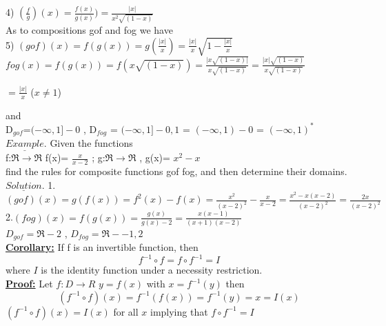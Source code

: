 \documentclass[11pt]{amsbook}
\begin{document}
4) $ (\frac{f}{g})(x) = \frac{f(x)}{g(x)}) = \frac{|x|}{x^2\sqrt{(1-x)} } $\\
As to compositions gof and fog we have\\
\vspace{4 mm}
5) $ (gof)(x) = f(g(x)) = g(\frac{|x|}{x}) =\frac{|x|}{x} \sqrt{1-\frac{|x|}{x}}$\\
$fog(x) = f(g(x))= f(x\sqrt {(1-x)}) = \frac {|x\sqrt{ (1-x)| }} {x\sqrt {(1-x)}} = \frac {|x|\sqrt {(1-x)}} {x\sqrt {(1-x)}}$\\
\begin{center}
    $ = \frac {|x|}{x}$ \hspace{3mm} ($x\neq 1$)\\
\end{center}
and\\
D$_{gof}$=$(-\infty , 1 ] - {0}$ , D$_{fog}$ = $(-\infty , 1 ] - {0,1}$  = $(-\infty , 1 ) - {0}$ = $(-\infty , 1 )^*$\\
$\underline{Example}$. Given the functions \\
f:$\Re \rightarrow \Re $ \hspace{2mm} f(x)= $\frac{x}{x-2}$ ; g:$\Re \rightarrow \Re $ , g(x)= $x^2-x$\\
find the rules for composite functions gof fog, and then determine their domains.
$\underline{Solution}$. 
1.$(gof)(x) = g(f(x)) = f^2(x)- f(x) = \frac{x^2}{(x-2)^2}- \frac{x}{x-2} =\frac{ x^2 - x(x-2)}{(x-2)^2}  = \frac {2x} {(x-2)^2}  $\\
\vspace{2 mm}
2.$(fog)(x) = f(g(x)) = \frac{g(x)}{g(x)-2} = \frac{x(x-1)}{(x+1)(x-2)}    $\\
$D_{gof} = \Re - {2} $ , \hspace{4mm} $D_{fog}= \Re -{ -1 ,2 }$\\

\textbf{\underline{Corollary:}} If f is an invertible function, then
\begin{equation*}
f^{-1} \circ f  =  f \circ f^{-1}  = I 
\end{equation*}
where $ I $ is the identity function under a necessity restriction.\\

\textbf{\underline{Proof:}} Let $f: D \rightarrow  R$  $y = f(x) $
with $x = f^{-1}(y)$ then 
\begin{equation*}
( f^{-1} \circ f)(x) = f^{-1}(f(x)) = f^{-1}(y) = x = I(x)
\end{equation*}
$(f^{-1} \circ f)(x) = I(x) $ for all $ x $ implying that $f \circ f^{-1} = I $
\end{document}
